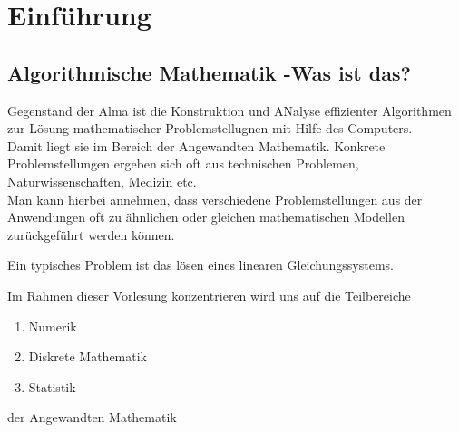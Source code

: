 \section*{Einführung}
\subsection*{Algorithmische Mathematik -Was ist das?}
Gegenstand der Alma ist die Konstruktion und ANalyse effizienter Algorithmen zur Lösung mathematischer Problemstellugnen mit Hilfe des Computers. \\
Damit liegt sie im Bereich der Angewandten Mathematik. 
Konkrete Problemstellungen ergeben sich oft aus technischen Problemen, Naturwissenschaften, Medizin etc. \\
Man kann hierbei annehmen, dass verschiedene Problemstellungen aus der Anwendungen oft zu ähnlichen oder gleichen mathematischen Modellen zurückgeführt werden können. \\
\begin{example}
Ein typisches Problem ist das lösen eines linearen Gleichungssystems.
\end{example}
Im Rahmen dieser Vorlesung konzentrieren wird uns auf die Teilbereiche
\begin{enumerate}
	\item Numerik
	\item Diskrete Mathematik
	\item Statistik
\end{enumerate}
der Angewandten Mathematik
